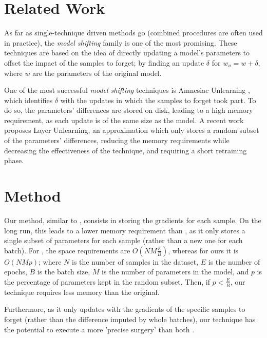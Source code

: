 \documentclass{article}
\begin{document}
\section{Related Work}
As far as single-technique driven methods go (combined procedures are often used in practice), the \emph{model shifting} \cite{xu2023survey} family is one of the most promising. These techniques are based on the idea of directly updating a model's parameters to offset the impact of the samples to forget; by finding an update $\delta$ for $w_u=w+\delta$, where $w$ are the parameters of the original model. %

One of the most successful \emph{model shifting} techniques is Amnesiac Unlearning \cite{graves2021amnesiac}, which identifies $\delta$ with the updates in which the samples to forget took part. To do so, the parameters' differences are stored on disk, leading to a high memory requirement, as each update is of the same size as the model. %
A recent work \cite{gogineni2024efficient} proposes Layer Unlearning, an approximation which only stores a random subset of the parameters' differences, reducing the memory requirements while decreasing the effectiveness of the technique, and requiring a short retraining phase.

\section{Method}
Our method, similar to \cite{gogineni2024efficient}, consists in storing the gradients for each sample. On the long run, this leads to a lower memory requirement than \cite{graves2021amnesiac}, as it only stores a single subset of parameters for each sample (rather than a new one for each batch). For \cite{graves2021amnesiac}, the space requirements are $O(NM\frac{E}{B})$, whereas for ours it is $O(NMp)$; where $N$ is the number of samples in the dataset, $E$ is the number of epochs, $B$ is the batch size, $M$ is the number of parameters in the model, and $p$ is the percentage of parameters kept in the random subset. Then, if $p<\frac{E}{B}$, our technique requires less memory than the original.

Furthermore, as it only updates with the gradients of the specific samples to forget (rather than the difference imputed by whole batches), our technique has the potential to execute a more 'precise surgery' than both \cite{graves2021amnesiac, gogineni2024efficient}.
\end{document}
